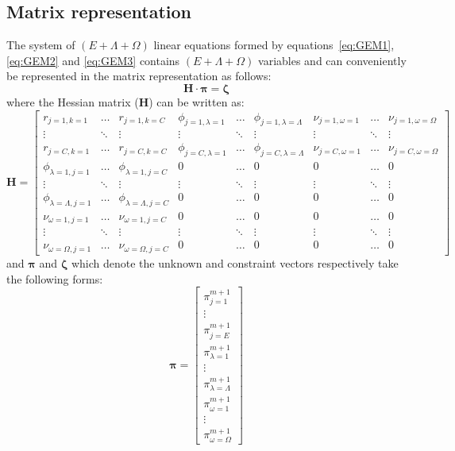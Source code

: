 	\subsection{Matrix representation}
	The system of $(E+\Lambda+\Omega)$ linear equations formed by equations~\eqref{eq:GEM1}, \eqref{eq:GEM2} and \eqref{eq:GEM3} contains $(E+\Lambda+\Omega)$ variables and can conveniently be represented in the matrix representation as follows:
	\begin{equation}\label{eq:GEM_mat}
		\mathbf{H}\cdot\boldsymbol{\pi} = \boldsymbol{\zeta}
	\end{equation}
	where the Hessian matrix ($\mathbf{H}$) can be written as:
	\begin{equation}\label{eq:Hessian_mat}
        \mathbf{H} = 
        \begin{bmatrix}
            r_{j=1,k=1} & \dots & r_{j=1,k=C} & \phi_{j=1,\lambda=1} & \dots & \phi_{j=1,\lambda=\Lambda} & \nu_{j=1,\omega=1} & \dots & \nu_{j=1,\omega=\Omega} \\
            \vdots & \ddots & \vdots & \vdots & \ddots & \vdots & \vdots & \ddots & \vdots \\
            r_{j=C,k=1} & \dots & r_{j=C,k=C} & \phi_{j=C,\lambda=1} & \dots & \phi_{j=C,\lambda=\Lambda} & \nu_{j=C,\omega=1} & \dots & \nu_{j=C,\omega=\Omega} \\
            \phi_{\lambda=1,j=1} & \dots & \phi_{\lambda=1,j=C} & 0 & \dots & 0 & 0 & \dots & 0 \\
            \vdots & \ddots & \vdots & \vdots & \ddots & \vdots & \vdots & \ddots & \vdots \\
            \phi_{\lambda=\Lambda,j=1} & \dots & \phi_{\lambda=\Lambda,j=C} & 0 & \dots & 0 & 0 & \dots & 0 \\
            \nu_{\omega=1,j=1} & \dots & \nu_{\omega=1,j=C} & 0 & \dots & 0 & 0 & \dots & 0 \\
            \vdots & \ddots & \vdots & \vdots & \ddots & \vdots & \vdots & \ddots & \vdots \\
            \nu_{\omega=\Omega,j=1} & \dots & \nu_{\omega=\Omega,j=C} & 0 & \dots & 0 & 0 & \dots & 0 
        \end{bmatrix}
    \end{equation}
    and $\boldsymbol{\pi}$ and $\boldsymbol{\zeta}$ which denote the unknown and constraint vectors respectively take the following forms:
    \begin{equation}\label{eq:LagMult_mat}
        \boldsymbol{\pi} = 
        \begin{bmatrix}
            \pi_{j=1}^{m+1} \\
            \vdots \\
            \pi_{j=E}^{m+1} \\
            \pi_{\lambda=1}^{m+1} \\
            \vdots \\
            \pi_{\lambda=\Lambda}^{m+1} \\
            \pi_{\omega=1}^{m+1} \\
            \vdots\\
            \pi_{\omega=\Omega}^{m+1}
        \end{bmatrix}
    \end{equation}
    
